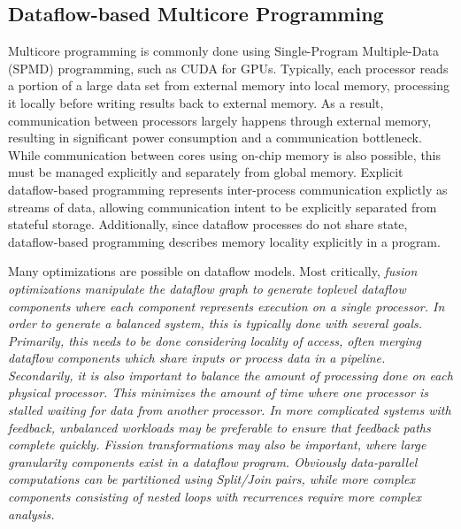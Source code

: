 \documentclass{tufte-handout}
\begin{document}
\subsection{Dataflow-based Multicore Programming}\label{sec:dataflowmulticore}

Multicore programming is commonly done using Single-Program Multiple-Data (SPMD) programming, such as CUDA for GPUs.  Typically, each processor reads a portion of a large data set from external memory into local memory, processing it locally before writing results back to external memory.  As a result, communication between processors largely happens through external memory, resulting in significant power consumption and a communication bottleneck.  While communication between cores using on-chip memory is also possible, this must be managed explicitly and separately from global memory.  Explicit dataflow-based programming represents inter-process communication explictly as streams of data, allowing communication intent to be explicitly separated from stateful storage.  Additionally, since dataflow processes do not share state, dataflow-based programming describes memory locality explicitly in a program.

Many optimizations are possible on dataflow models.  Most critically, \em{fusion} optimizations manipulate the dataflow graph to generate toplevel dataflow components where each component represents execution on a single processor.\cite{gordon02streamit}  In order to generate a balanced system, this is typically done with several goals.  Primarily, this needs to be done considering locality of access, often merging dataflow components which share inputs or process data in a pipeline.  Secondarily, it is also important to balance the amount of processing done on each physical processor.  This minimizes the amount of time where one processor is stalled waiting for data from another processor.  In more complicated systems with feedback, unbalanced workloads may be preferable to ensure that feedback paths complete quickly.  \em{Fission} transformations may also be important, where large granularity components exist in a dataflow program.  Obviously data-parallel computations can be partitioned using Split/Join pairs, while more complex components consisting of nested loops with recurrences require more complex analysis.\cite{rijpkema00compaan} 
\end{document}
